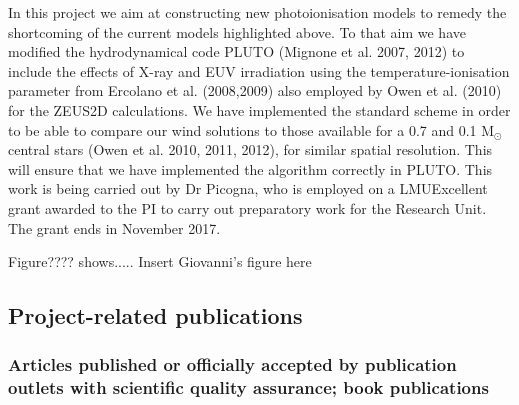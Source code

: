 \documentclass[10pt,fleqn,twoside]{article}
\newcommand{\Tcol}{\color{blue}}
\begin{document}
In this project we aim at constructing new photoionisation models to
remedy the shortcoming of the current models highlighted above. To
that aim we have modified the hydrodynamical code PLUTO (Mignone et
al. 2007, 2012) to include the
effects of X-ray and EUV irradiation using the temperature-ionisation
parameter from Ercolano et al. (2008,2009) also employed by Owen et
al. (2010) for the ZEUS2D calculations. We have implemented the
standard scheme in order to be able to compare our wind solutions to 
those available for a 0.7 and 0.1 M$_\odot$ central
stars (Owen et al. 2010, 2011, 2012), for similar spatial
resolution. This will ensure that we have implemented the algorithm
correctly in PLUTO.  This work is being carried out by Dr Picogna, who
is employed on a LMUExcellent grant awarded to the PI to carry out
preparatory work for the Research Unit. The grant ends in November
2017. 

Figure???? shows..... {\color{red} Insert Giovanni's figure here}


\subsection{\Tcol Project-related publications}


\subsubsection{\Tcol 
Articles published or officially accepted by publication outlets with scientific quality assurance;
book publications}
\end{document}
